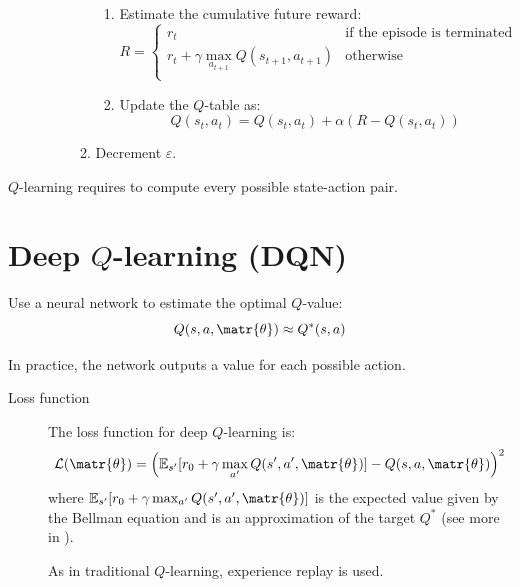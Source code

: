 \begin{description}
\begin{itemize}
\begin{enumerate}
\begin{enumerate}
                    \item Estimate the cumulative future reward:
                        \[ R = \begin{cases}
                            r_t & \text{if the episode is terminated} \\
                            r_t + \gamma \max_{a_{t+1}} Q(s_{t+1}, a_{t+1}) & \text{otherwise} \\
                        \end{cases} \]
                    \item Update the $Q$-table as:
                        \[ Q(s_t, a_t) = Q(s_t, a_t) + \alpha(R - Q(s_t, a_t)) \]
                \end{enumerate}
                \item Decrement $\varepsilon$.
            \end{enumerate}
        \end{itemize} 
\end{description}

\begin{remark}
    $Q$-learning requires to compute every possible state-action pair.
\end{remark}



\section{Deep $Q$-learning (DQN)}

Use a neural network to estimate the optimal $Q$-value:
\[ Q(s, a, \matr{\theta}) \approx Q^*(s, a) \]

\begin{remark}
    In practice, the network outputs a value for each possible action.
\end{remark}

\begin{description}
    \item[Loss function] 
        The loss function for deep $Q$-learning is:
        \[ \mathcal{L}(\matr{\theta}) = \left( \mathbb{E}_{s'}[r_0 + \gamma \max_{a'} Q(s', a', \matr{\theta})] - Q(s, a, \matr{\theta}) \right)^2 \]
        where $\mathbb{E}_{s'}[r_0 + \gamma \max_{a'} Q(s', a', \matr{\theta})]$ is the expected value given by the Bellman equation and is an approximation of the target $Q^*$ (see more in ).

        \begin{remark}
            As in traditional $Q$-learning, experience replay is used.
        \end{remark}
\end{description}

